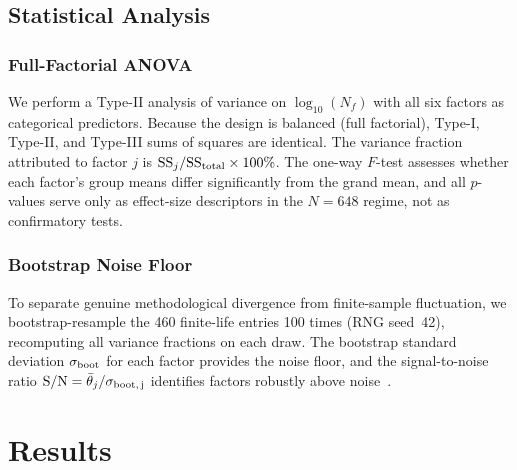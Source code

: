\documentclass[12pt,a4paper]{article}
\begin{document}
\subsection{Statistical Analysis}

\subsubsection{Full-Factorial ANOVA}

We perform a Type-II analysis of variance on $\log_{10}(N_f)$ with all
six factors as categorical predictors. Because the design is balanced
(full factorial), Type-I, Type-II, and Type-III sums of squares are
identical. The variance fraction attributed to factor $j$ is
$\mathrm{SS}_j / \mathrm{SS}_{\rm total} \times 100\%$. The
one-way $F$-test assesses whether each factor's group means differ
significantly from the grand mean, and all $p$-values serve only as
effect-size descriptors in the $N=648$ regime, not as confirmatory
tests.

\subsubsection{Bootstrap Noise Floor}

To separate genuine methodological divergence from finite-sample
fluctuation, we bootstrap-resample the 460 finite-life entries 100
times (RNG seed~42), recomputing all variance fractions on each draw.
The bootstrap standard deviation $\sigma_{\rm boot}$ for each factor
provides the noise floor, and the signal-to-noise ratio
$\mathrm{S/N} = \bar{\theta}_j / \sigma_{\rm boot,\,j}$ identifies
factors robustly above noise~\cite{chen2026etaearth}.

\section{Results}
\label{sec:results}
\end{document}
